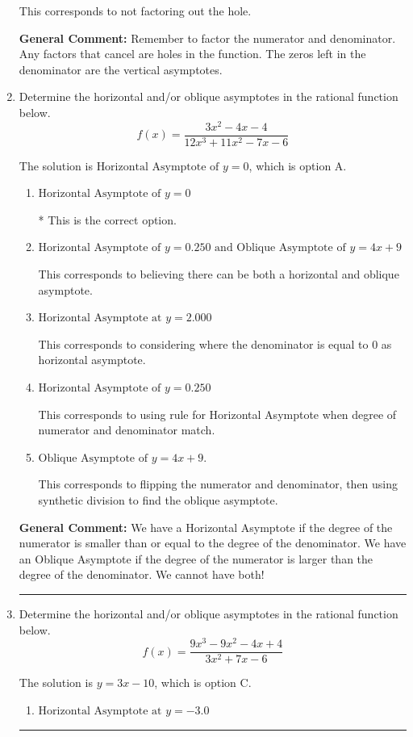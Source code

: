 \documentclass{extbook}[14pt]
\newcommand{\litem}[1]{\item #1

\rule{\textwidth}{0.4pt}}
\begin{document}
\begin{enumerate}
{\begin{enumerate}[label=\Alph*.]
This corresponds to not factoring out the hole.
\end{enumerate}

\textbf{General Comment:} Remember to factor the numerator and denominator. Any factors that cancel are holes in the function. The zeros left in the denominator are the vertical asymptotes.
}
\litem{
Determine the horizontal and/or oblique asymptotes in the rational function below.
\[ f(x) = \frac{3x^{2} -4 x -4}{12x^{3} +11 x^{2} -7 x -6} \]

The solution is \( \text{Horizontal Asymptote of } y = 0 \), which is option A.\begin{enumerate}[label=\Alph*.]
\item \( \text{Horizontal Asymptote of } y = 0 \)

* This is the correct option.
\item \( \text{Horizontal Asymptote of } y = 0.250 \text{ and Oblique Asymptote of } y = 4x + 9 \)

This corresponds to believing there can be both a horizontal and oblique asymptote.
\item \( \text{Horizontal Asymptote at } y = 2.000 \)

This corresponds to considering where the denominator is equal to 0 as horizontal asymptote.
\item \( \text{Horizontal Asymptote of } y = 0.250  \)

This corresponds to using rule for Horizontal Asymptote when degree of numerator and denominator match.
\item \( \text{Oblique Asymptote of } y = 4x + 9. \)

This corresponds to flipping the numerator and denominator, then using synthetic division to find the oblique asymptote.
\end{enumerate}

\textbf{General Comment:} We have a Horizontal Asymptote if the degree of the numerator is smaller than or equal to the degree of the denominator. We have an Oblique Asymptote if the degree of the numerator is larger than the degree of the denominator. We cannot have both!
}
\litem{
Determine the horizontal and/or oblique asymptotes in the rational function below.
\[ f(x) = \frac{9x^{3} -9 x^{2} -4 x + 4}{3x^{2} +7 x -6} \]

The solution is \( y = 3x -10 \), which is option C.\begin{enumerate}[label=\Alph*.]
\item \( \text{Horizontal Asymptote at } y = -3.0 \)


\end{enumerate}}
\end{enumerate}
\end{document}
